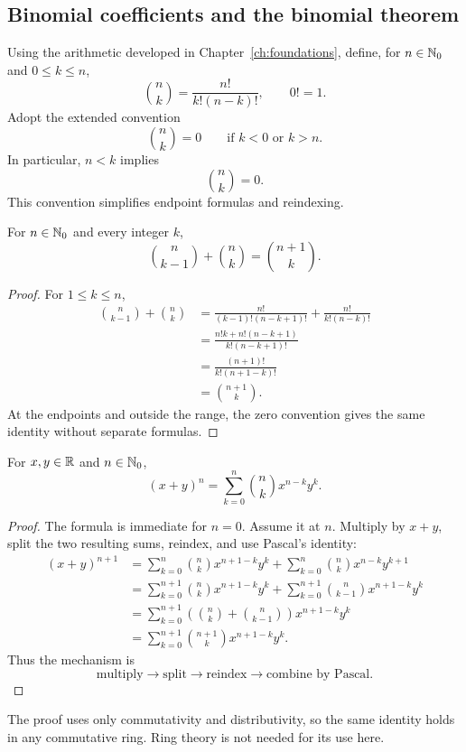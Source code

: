 \subsection*{Binomial coefficients and the binomial theorem}
Using the arithmetic developed in Chapter~\ref{ch:foundations}, define, for
\(n\in\mathbb{N}_0\) and \(0\leq k\leq n\),
\[
\binom nk=\frac{n!}{k!(n-k)!},
\qquad
0!=1.
\]
Adopt the extended convention
\[
\boxed{\binom nk=0\qquad\text{if }k<0\text{ or }k>n.}
\]
In particular, \(n<k\) implies
\[
\binom nk=0.
\]
 This convention simplifies
endpoint formulas and reindexing.

\begin{proposition}
For \(n\in\mathbb{N}_0\) and every integer \(k\),
\[
\boxed{\binom n{k-1}+\binom nk=\binom{n+1}k.}
\]
\end{proposition}
\begin{proof}
For \(1\leq k\leq n\),
\begin{align*}
\binom n{k-1}+\binom nk
&=\frac{n!}{(k-1)!(n-k+1)!}+\frac{n!}{k!(n-k)!}\\
&=\frac{n!k+n!(n-k+1)}{k!(n-k+1)!}\\
&=\frac{(n+1)!}{k!(n+1-k)!}\\
&=\binom{n+1}k.
\end{align*}
At the endpoints and outside the range, the zero convention gives the same
identity without separate formulas.
\end{proof}

\begin{theorem}\label{thm:appendix-binomial}
For \(x,y\in\mathbb{R}\) and \(n\in\mathbb{N}_0\),
\[
\boxed{(x+y)^n=\sum_{k=0}^{n}\binom nk x^{n-k}y^k.}
\]
\end{theorem}
\begin{proof}
The formula is immediate for \(n=0\). Assume it at \(n\). Multiply by
\(x+y\), split the two resulting sums, reindex, and use Pascal's identity:
\begin{align*}
(x+y)^{n+1}
&=\sum_{k=0}^{n}\binom nk x^{n+1-k}y^k
 +\sum_{k=0}^{n}\binom nk x^{n-k}y^{k+1}\\
&=\sum_{k=0}^{n+1}\binom nk x^{n+1-k}y^k
 +\sum_{k=0}^{n+1}\binom n{k-1}x^{n+1-k}y^k\\
&=\sum_{k=0}^{n+1}\left(\binom nk+\binom n{k-1}\right)
 x^{n+1-k}y^k\\
&=\sum_{k=0}^{n+1}\binom{n+1}k x^{n+1-k}y^k.
\end{align*}
Thus the mechanism is
\[
\text{multiply}\to\text{split}\to\text{reindex}\to\text{combine by Pascal}.
\]
\end{proof}
The proof uses only commutativity and distributivity, so the same identity
holds in any commutative ring. Ring theory is not needed for its use here.

